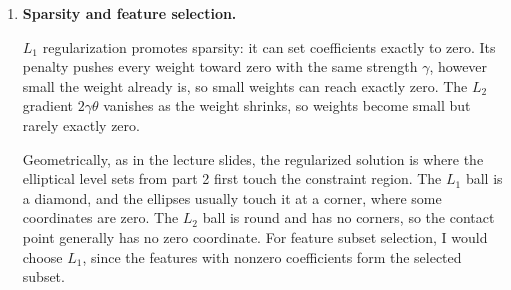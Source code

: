 \documentclass[12pt]{article}
\theoremstyle{definition}
\begin{document}
{\begin{enumerate}[label=\textbf{(\arabic*)}, leftmargin=*]
    Let $X$ have rows $[1,x_i]$, let $\beta=(\beta_0,\beta_1)^\top$,
    and suppose the feature values are not all equal, so $X$ has full column
    rank. The least-squares minimizer $\widehat\beta$ satisfies
    $X^\top(y-X\widehat\beta)=0$. Expanding around $\widehat\beta$ gives
    \[
        L(\beta)=\tfrac12\|y-X\beta\|_2^2
        =L(\widehat\beta)+\tfrac12(\beta-\widehat\beta)^\top
        X^\top X(\beta-\widehat\beta).
    \]
    Since $X^\top X$ is symmetric positive definite, write
    $X^\top X=Q\operatorname{diag}(a_1,a_2)Q^\top$ with $a_1,a_2>0$.
    In coordinates $u=Q^\top(\beta-\widehat\beta)$, the level set
    $L(\beta)=L(\widehat\beta)+c$, for $c>0$, becomes
    \[
        \frac{u_1^2}{2c/a_1}+\frac{u_2^2}{2c/a_2}=1,
    \]
    an ellipse centered at $\widehat\beta$. At the minimum the level set
    is a point, and below it the level set is empty. If all feature values
    are equal, $X$ is rank deficient and the level sets are pairs of
    parallel lines rather than ellipses.

    \item \textbf{Sparsity and feature selection.}\nopagebreak[4]

    $L_1$ regularization promotes sparsity: it can set coefficients exactly
    to zero. Its penalty pushes every weight toward zero with the same
    strength $\gamma$, however small the weight already is, so small weights
    can reach exactly zero. The $L_2$ gradient $2\gamma\theta$ vanishes as the
    weight shrinks, so weights become small but rarely exactly zero.

    Geometrically, as in the lecture slides, the regularized solution is
    where the elliptical level sets from part 2 first touch the constraint
    region. The $L_1$ ball is a diamond, and the ellipses usually touch it
    at a corner, where some coordinates are zero. The $L_2$ ball is round
    and has no corners, so the contact point generally has no zero
    coordinate. For feature subset selection, I would choose $L_1$, since
    the features with nonzero coefficients form the selected subset.
\end{enumerate}
}
\end{document}
